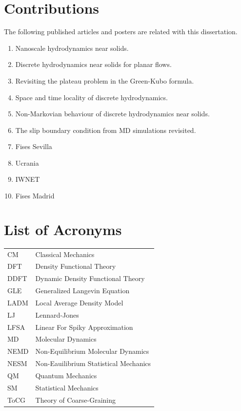 \documentclass[b5paper,openright,11pt]{book}
\begin{document}
\pagestyle{noHeader}
\begin{appendices}
\chapter{Contributions}\label{Ap:Contributions}
The following published articles and posters are related with this dissertation.
\begin{enumerate}
  \item Nanoscale hydrodynamics near solids.
  \item Discrete hydrodynamics near solids for planar flows.
  \item Revisiting the plateau problem in the Green-Kubo formula.
  \item Space and time locality of discrete hydrodynamics.
  \item Non-Markovian behaviour of discrete hydrodynamics near solids.
  \item The slip boundary condition from MD simulations revisited.
  \item Fises Sevilla
  \item Ucrania
  \item IWNET
  \item Fises Madrid
\end{enumerate}

\chapter{List of Acronyms}\label{Ap:Acronyms}
\begin{tabular}{l l}
    CM   & Classical Mechanics \\
    DFT  & Density Functional Theory \\
    DDFT & Dynamic Density Functional Theory \\
    GLE  & Generalized Langevin Equation \\
    LADM & Local Average Density Model \\
    LJ   & Lennard-Jones \\
    LFSA & Linear For Spiky Approximation \\
    MD   & Molecular Dynamics \\
    NEMD & Non-Equilibrium Molecular Dynamics\\
    NESM & Non-Eauilibrium Statistical Mechanics \\
    QM   & Quantum Mechanics \\
    SM   & Statistical Mechanics \\
    ToCG & Theory of Coarse-Graining \\
\end{tabular}



\end{appendices}
\end{document}
